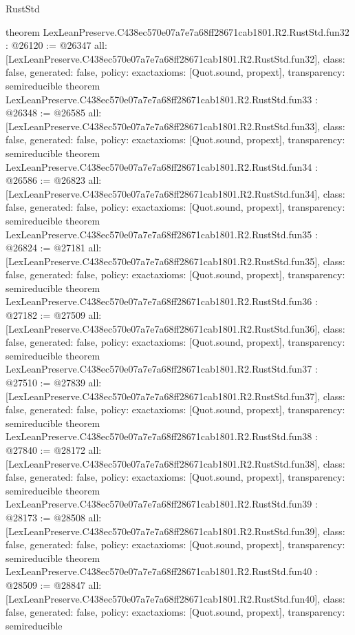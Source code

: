 \begin{lexlean}{RustStd}
\begin{coremodule}
{}
theorem LexLeanPreserve.C438ec570e07a7e7a68ff28671cab1801.R2.RustStd.fun32 : @26120 := @26347 {
  all: [LexLeanPreserve.C438ec570e07a7e7a68ff28671cab1801.R2.RustStd.fun32],
  class: false,
  generated: false,
  policy: exact{axioms: [Quot.sound, propext]},
  transparency: semireducible
}
theorem LexLeanPreserve.C438ec570e07a7e7a68ff28671cab1801.R2.RustStd.fun33 : @26348 := @26585 {
  all: [LexLeanPreserve.C438ec570e07a7e7a68ff28671cab1801.R2.RustStd.fun33],
  class: false,
  generated: false,
  policy: exact{axioms: [Quot.sound, propext]},
  transparency: semireducible
}
theorem LexLeanPreserve.C438ec570e07a7e7a68ff28671cab1801.R2.RustStd.fun34 : @26586 := @26823 {
  all: [LexLeanPreserve.C438ec570e07a7e7a68ff28671cab1801.R2.RustStd.fun34],
  class: false,
  generated: false,
  policy: exact{axioms: [Quot.sound, propext]},
  transparency: semireducible
}
theorem LexLeanPreserve.C438ec570e07a7e7a68ff28671cab1801.R2.RustStd.fun35 : @26824 := @27181 {
  all: [LexLeanPreserve.C438ec570e07a7e7a68ff28671cab1801.R2.RustStd.fun35],
  class: false,
  generated: false,
  policy: exact{axioms: [Quot.sound, propext]},
  transparency: semireducible
}
theorem LexLeanPreserve.C438ec570e07a7e7a68ff28671cab1801.R2.RustStd.fun36 : @27182 := @27509 {
  all: [LexLeanPreserve.C438ec570e07a7e7a68ff28671cab1801.R2.RustStd.fun36],
  class: false,
  generated: false,
  policy: exact{axioms: [Quot.sound, propext]},
  transparency: semireducible
}
theorem LexLeanPreserve.C438ec570e07a7e7a68ff28671cab1801.R2.RustStd.fun37 : @27510 := @27839 {
  all: [LexLeanPreserve.C438ec570e07a7e7a68ff28671cab1801.R2.RustStd.fun37],
  class: false,
  generated: false,
  policy: exact{axioms: [Quot.sound, propext]},
  transparency: semireducible
}
theorem LexLeanPreserve.C438ec570e07a7e7a68ff28671cab1801.R2.RustStd.fun38 : @27840 := @28172 {
  all: [LexLeanPreserve.C438ec570e07a7e7a68ff28671cab1801.R2.RustStd.fun38],
  class: false,
  generated: false,
  policy: exact{axioms: [Quot.sound, propext]},
  transparency: semireducible
}
theorem LexLeanPreserve.C438ec570e07a7e7a68ff28671cab1801.R2.RustStd.fun39 : @28173 := @28508 {
  all: [LexLeanPreserve.C438ec570e07a7e7a68ff28671cab1801.R2.RustStd.fun39],
  class: false,
  generated: false,
  policy: exact{axioms: [Quot.sound, propext]},
  transparency: semireducible
}
theorem LexLeanPreserve.C438ec570e07a7e7a68ff28671cab1801.R2.RustStd.fun40 : @28509 := @28847 {
  all: [LexLeanPreserve.C438ec570e07a7e7a68ff28671cab1801.R2.RustStd.fun40],
  class: false,
  generated: false,
  policy: exact{axioms: [Quot.sound, propext]},
  transparency: semireducible
}
\end{coremodule}
\end{lexlean}
